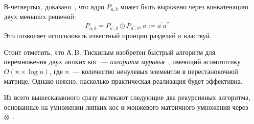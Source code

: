 В-четвертых, доказано~\cite{tiskin2006all}, что  ядро $P_{a,b}$ может быть выражено через конкатенацию двух меньших решений:
\begin{equation}\label{formulaKernelCompistion}
P_{a,b}  = P_{a^{'},b} \odot P_{a^{''},b}, a  := a^{'}a^{''}
\end{equation}
Это позволяет использовать известный принцип {разделяй и властвуй}.

Стоит отметить, что А.\,B. Тискиным изобретен быстрый алгоритм для перемножения двух липких кос~--- \emph{алгоритм муравья}~\cite{tiskin2015fast}, имеющий асимптотику $O(n\times \log n)$, где $n$~--- количество ненулевых элементов в перестановочной матрице.
Однако неясно, насколько практическая реализация будет эффективна.

Из всего вышесказанного сразу вытекают следующие два рекурсивных алгоритма, основанные на умножении липких кос  и монжевого матричного умножения через $\otimes$~\cite{tiskin2008semi}.



